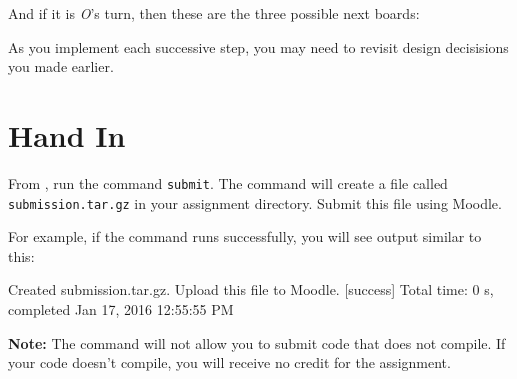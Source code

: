 \documentclass{book}
\begin{document}
\begin{enumerate}
And if it is \emph{O}'s turn, then these are the three possible next boards:

\quad
{}
\quad
{}

\end{enumerate}

As you implement each successive step, you may need to revisit design
decisisions you made earlier.

\section{Hand In}

From \sbt{}, run the command \verb|submit|. The command will create
a file called \verb|submission.tar.gz| in your assignment directory.
Submit this file using Moodle.

For example, if the command runs successfully, you will see output similar
to this:
%
\begin{console}
Created submission.tar.gz. Upload this file to Moodle.
[success] Total time: 0 s, completed Jan 17, 2016 12:55:55 PM
\end{console}

\textbf{Note:}  The command will not allow you to submit code that does not
compile. If your code doesn't compile, you will receive no credit for the
assignment.

\newlecture
\end{document}
